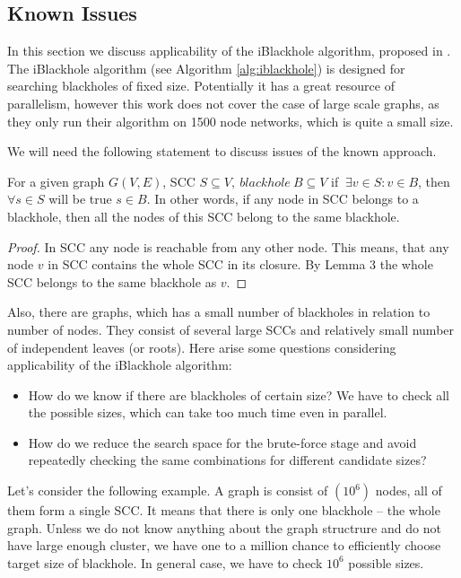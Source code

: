 \documentclass{svproc}
\begin{document}
\subsection{Known Issues}
In this section we discuss applicability of the iBlackhole algorithm, proposed in \cite{li2010detecting}.
The iBlackhole algorithm (see Algorithm \ref{alg:iblackhole}) is designed for searching blackholes of fixed size. Potentially it has a great resource of parallelism, however this work does not cover the case of large scale graphs, as they only run their algorithm on 1500 node networks, which is quite
a small size.

We will need the following statement to discuss issues of the known approach.
\begin{lemma}
	For a given graph $G(V,E)$, SCC $S \subseteq V,\ blackhole\ B \subseteq V$ if $\ \exists v \in S: v \in B$,  then $\forall s \in S$ will be true $s \in B$.
	In other words, if any node in SCC belongs to a blackhole, then all the nodes of this SCC belong to the same blackhole.
\end{lemma}
\begin{proof}
	In SCC any node is reachable from any other node. This means, that any node $v$ in SCC contains the whole SCC in its closure. By Lemma 3 the whole SCC belongs to the same blackhole as $v$. 
\end{proof}

Also, there are graphs, which has a small number of blackholes in relation to number of nodes. They consist
of several large SCCs and relatively small number of independent leaves (or roots). Here arise some questions considering applicability of the
iBlackhole algorithm:
\begin{itemize}
\item How do we know if there are blackholes of certain size? We have to check all the possible sizes, which can take too much time even in parallel.
\item How do we reduce the search space for the brute-force stage and avoid repeatedly checking the same combinations for different candidate sizes?
\end{itemize}

Let's consider the following example. A graph is consist of $(10^6)$ nodes, all of them form a single SCC. It means that there is only one blackhole -- the whole graph.
Unless we do not know anything about the graph structrure and do not have large enough cluster, we have one to a million chance
to efficiently choose target size of blackhole. In general case, we have to check $10^6$ possible sizes.
\end{document}
